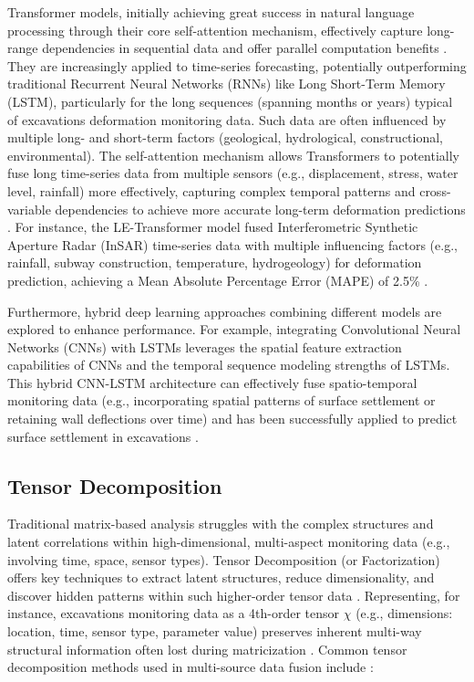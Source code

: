 \documentclass[preprint,11pt,authoryear,3p]{elsarticle}
\begin{document}
Transformer models, initially achieving great success in natural language processing through their core self-attention mechanism, effectively capture long-range dependencies in sequential data and offer parallel computation benefits \citep{Vaswani2017Attention}. They are increasingly applied to time-series forecasting, potentially outperforming traditional Recurrent Neural Networks (RNNs) like Long Short-Term Memory (LSTM), particularly for the long sequences (spanning months or years) typical of excavations deformation monitoring data. Such data are often influenced by multiple long- and short-term factors (geological, hydrological, constructional, environmental). The self-attention mechanism allows Transformers to potentially fuse long time-series data from multiple sensors (e.g., displacement, stress, water level, rainfall) more effectively, capturing complex temporal patterns and cross-variable dependencies to achieve more accurate long-term deformation predictions \citep{Nie2023PatchTST}. For instance, the LE-Transformer model fused Interferometric Synthetic Aperture Radar (InSAR) time-series data with multiple influencing factors (e.g., rainfall, subway construction, temperature, hydrogeology) for deformation prediction, achieving a Mean Absolute Percentage Error (MAPE) of 2.5\% \citep{rs17061106}.

Furthermore, hybrid deep learning approaches combining different models are explored to enhance performance. For example, integrating Convolutional Neural Networks (CNNs) with LSTMs leverages the spatial feature extraction capabilities of CNNs and the temporal sequence modeling strengths of LSTMs. This hybrid CNN-LSTM architecture can effectively fuse spatio-temporal monitoring data (e.g., incorporating spatial patterns of surface settlement or retaining wall deflections over time) and has been successfully applied to predict surface settlement in excavations \citep{zhao_spatiotemporal_2021, WANG2024105733}.

\subsection{Tensor Decomposition}

Traditional matrix-based analysis struggles with the complex structures and latent correlations within high-dimensional, multi-aspect monitoring data (e.g., involving time, space, sensor types). Tensor Decomposition (or Factorization) offers key techniques to extract latent structures, reduce dimensionality, and discover hidden patterns within such higher-order tensor data \citep{7891546}. Representing, for instance, excavations monitoring data as a 4th-order tensor $\chi$ (e.g., dimensions: location, time, sensor type, parameter value) preserves inherent multi-way structural information often lost during matricization \citep{adarkwa2015tensor}. Common tensor decomposition methods used in multi-source data fusion include \citep{SALEHI2023106659}:
\end{document}
